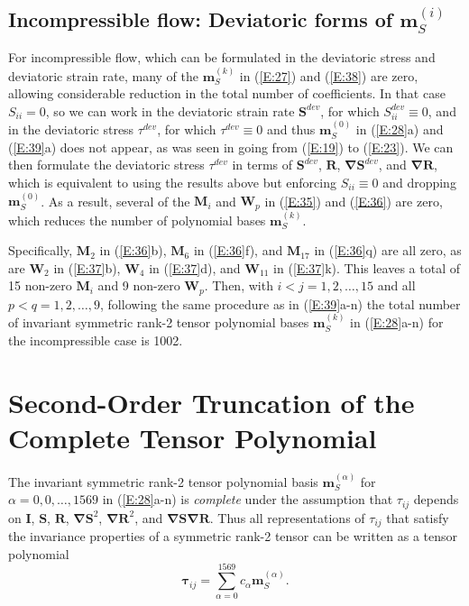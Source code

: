 \subsection{Incompressible flow: Deviatoric forms of $\mathbf{m}^{(i)}_S$ }
\label{sec:2F}

For incompressible flow, which can be formulated in the deviatoric stress and deviatoric strain rate, many of the $\mathbf{m}^{(k)}_S$  in (\ref{E:27}) and (\ref{E:38}) are zero, allowing considerable reduction in the total number of coefficients.  In that case $S_{ii} = 0$, so we can work in the deviatoric strain rate $\mathbf{S}^{dev}$, for which $S^{dev}_{ii} \equiv 0$, and in the deviatoric stress $\tau^{dev}$, for which $\tau^{dev} \equiv 0$  and thus $\mathbf{m}^{(0)}_S$  in (\ref{E:28}a) and (\ref{E:39}a) does not appear, as was seen in going from (\ref{E:19}) to (\ref{E:23}).  We can then formulate the deviatoric stress $\tau^{dev}$  in terms of $\mathbf{S}^{dev}$, $\mathbf{R}$, $\mathbf{\nabla S}^{dev}$, and $\mathbf{\nabla R}$, which is equivalent to using the results above but enforcing $S_{ii} \equiv 0$  and dropping $\mathbf{m}^{(0)}_S$.  As a result, several of the  $\mathbf{M}_i$ and $\mathbf{W}_p$ in (\ref{E:35}) and (\ref{E:36}) are zero, which reduces the number of polynomial bases $\mathbf{m}^{(k)}_S$.  

Specifically,  $\mathbf{M}_2$ in (\ref{E:36}b),  $\mathbf{M}_6$ in (\ref{E:36}f), and $\mathbf{M}_{17}$  in (\ref{E:36}q) are all zero, as are $\mathbf{W}_2$  in (\ref{E:37}b),  $\mathbf{W}_4$ in (\ref{E:37}d), and $\mathbf{W}_{11}$  in (\ref{E:37}k).  This leaves a total of 15 non-zero $\mathbf{M}_i$  and 9 non-zero $\mathbf{W}_p$.  Then, with $i<j = 1,2,\ldots,15$  and all $p<q = 1,2,\ldots,9$, following the same procedure as in (\ref{E:39}a-n) the total number of invariant symmetric rank-2 tensor polynomial bases   $\mathbf{m}^{(k)}_S$ in (\ref{E:28}a-n) for the incompressible case is 1002.  


\section{Second-Order Truncation of the Complete Tensor Polynomial}
\label{sec:3}

The invariant symmetric rank-2 tensor polynomial basis  $\mathbf{m}^{(\alpha)}_S$  for  $\alpha = 0,0,\ldots,1569$ in (\ref{E:28}a-n) is \textit{complete} under the assumption that  $\tau_{ij}$ depends on $\mathbf{I}$, $\mathbf{S}$, $\mathbf{R}$, $\mathbf{\nabla S}^{2}$, $\mathbf{\nabla R}^{2}$, and $\mathbf{\nabla S \nabla R}$.  Thus all representations of $\tau_{ij}$ that satisfy the invariance properties of a symmetric rank-2 tensor can be written as a tensor polynomial
%
\begin{equation}
\label{E:40}
	\mathbf{\tau}_{ij} = \sum_{\alpha=0}^{1569} c_{\alpha} \mathbf{m}^{(\alpha)}_{S}.
\end{equation}
%
% 

